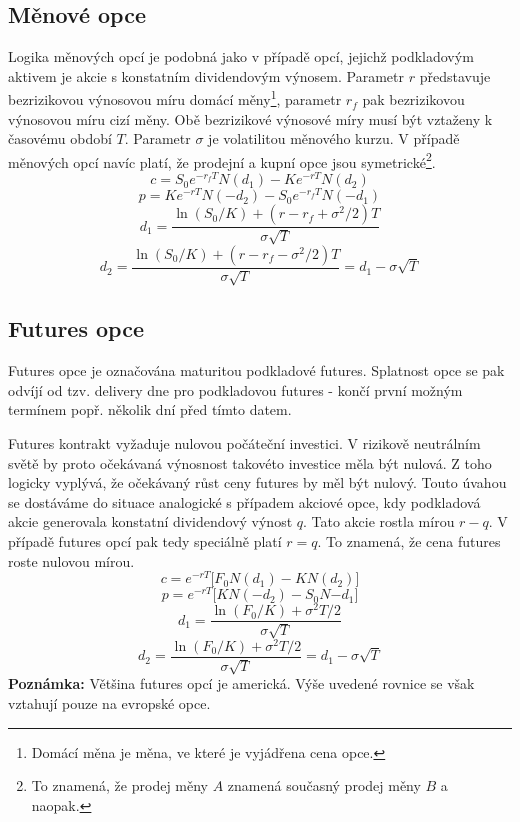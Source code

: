 \documentclass[a4paper]{book}
\begin{document}
\subsection{Měnové opce}

Logika měnových opcí je podobná jako v případě opcí, jejichž podkladovým aktivem je akcie s konstatním dividendovým výnosem. Parametr $r$ představuje bezrizikovou výnosovou míru domácí měny\footnote{Domácí měna je měna, ve které je vyjádřena cena opce.}, parametr $r_f$ pak bezrizikovou výnosovou míru cizí měny. Obě bezrizikové výnosové míry musí být vztaženy k časovému období $T$. Parametr $\sigma$ je volatilitou měnového kurzu. V případě měnových opcí navíc platí, že prodejní a kupní opce jsou symetrické\footnote{To znamená, že prodej měny $A$ znamená současný prodej měny $B$ a naopak.}.
\begin{equation*}
c = S_0 e^{-r_fT} N(d_1) - Ke^{-rT}N(d_2)
\end{equation*}
\begin{equation*}
p = K e^{-rT}N(-d_2)-S_0e^{-r_fT}N(-d_1)
\end{equation*}
\begin{equation*}
d_1 = \frac{\ln (S_0/K)+(r-r_f+\sigma^2/2)T}{\sigma \sqrt{T}}
\end{equation*}
\begin{equation*}
d_2 = \frac{\ln (S_0/K)+(r-r_f-\sigma^2/2)T}{\sigma \sqrt{T}}=d_1-\sigma \sqrt{T}
\end{equation*}

\subsection{Futures opce}

Futures opce je označována maturitou podkladové futures. Splatnost opce se pak odvíjí od tzv. delivery dne pro podkladovou futures - končí první možným termínem popř. několik dní před tímto datem.

Futures kontrakt vyžaduje nulovou počáteční investici. V rizikově neutrálním světě by proto očekávaná výnosnost takovéto investice měla být nulová. Z toho logicky vyplývá, že očekávaný růst ceny futures by měl být nulový. Touto úvahou se dostáváme do situace analogické s případem akciové opce, kdy podkladová akcie generovala konstatní dividendový výnost $q$. Tato akcie rostla mírou $r-q$. V případě futures opcí pak tedy speciálně platí $r=q$. To znamená, že cena futures roste nulovou mírou.
\begin{equation}
c = e^{-rT} \bigg[F_0N(d_1) - KN(d_2) \bigg]
\end{equation}
\begin{equation}
p = e^{-rT} \bigg[ K N(-d_2)-S_0N{-d_1} \bigg]
\end{equation}
\begin{equation*}
d_1 = \frac{\ln (F_0/K)+\sigma^2T/2}{\sigma \sqrt{T}}
\end{equation*}
\begin{equation*}
d_2 = \frac{\ln (F_0/K)+\sigma^2T/2}{\sigma \sqrt{T}}=d_1-\sigma \sqrt{T}
\end{equation*}
\textbf{Poznámka:} Většina futures opcí je americká. Výše uvedené rovnice se však vztahují pouze na evropské opce.
\end{document}
